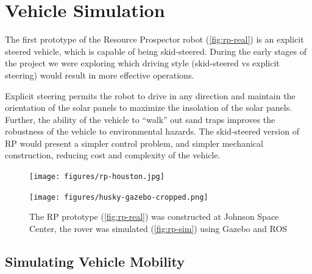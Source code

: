 \documentclass[twocolumn,letterpaper]{IEEEAerospaceCLS}  %
\begin{document}


\section{Vehicle Simulation}
\label{sec:vehicle-sim}

The first prototype of the Resource Prospector robot (\cref{fig:rp-real}) is an explicit steered vehicle, which is capable of being skid-steered.  During the early stages of the project we were exploring which driving style (skid-steered vs explicit steering) would result in more effective operations.  

Explicit steering permits the robot to drive in any direction and maintain the orientation of the solar panels to maximize the insolation of the solar panels.  Further, the ability of the vehicle to ``walk'' out sand traps improves the robustness of the vehicle to environmental hazards.  The skid-steered version of RP would present a simpler control problem, and simpler mechanical construction, reducing cost and complexity of the vehicle.

\begin{figure}[htp]
\begin{subfloat}{
\texttt{[image: figures/rp-houston.jpg]}\label{fig:rp-real}
}
\end{subfloat}
\qquad
\begin{subfloat}{
\texttt{[image: figures/husky-gazebo-cropped.png]}\label{fig:rp-sim}
}
\end{subfloat}
\caption{The RP prototype (\protect\cref{fig:rp-real}) was constructed at Johnson Space Center, the rover was simulated (\protect\cref{fig:rp-sim}) using Gazebo and ROS \label{fig:rover-by-sim}}
\end{figure}


\subsection{Simulating Vehicle Mobility}
\label{sec:simulated-rover}
\end{document}
